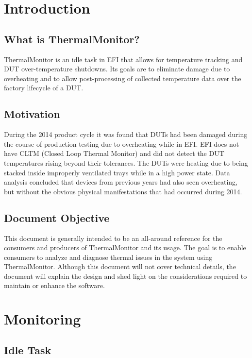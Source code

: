 
\section{Introduction}
\subsection{What is ThermalMonitor?}

ThermalMonitor is an idle task in EFI that allows for temperature tracking and
DUT over-tem\-per\-ature shutdowns. Its goals are to eliminate damage due to
overheating and to allow post-processing of collected temperature data over the
factory lifecycle of a DUT.

\subsection{Motivation}

During the 2014 product cycle it was found that DUTs had been damaged during
the course of production testing due to overheating while in EFI. EFI does not
have CLTM (Closed Loop Thermal Monitor) and did not detect the DUT temperatures
rising beyond their tolerances. The DUTs were heating due to being stacked
inside improperly ventilated trays while in a high power state. Data analysis
concluded that devices from previous years had also seen overheating, but
without the obvious physical manifestations that had occurred during 2014.

\subsection{Document Objective}

This document is generally intended to be an all-around reference for the
consumers and producers of ThermalMonitor and its usage. The goal is to enable
consumers to analyze and diagnose thermal issues in the system using
ThermalMonitor. Although this document will not cover technical details, the
document will explain the design and shed light on the considerations required
to maintain or enhance the software.

\section{Monitoring}
\subsection{Idle Task}

